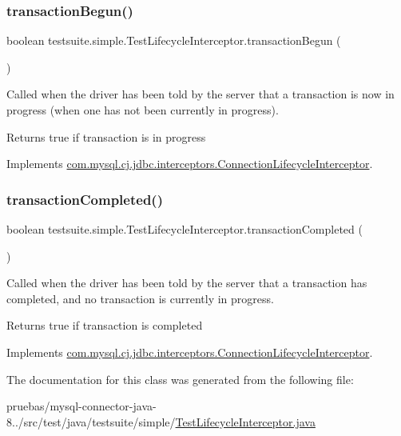 \subsubsection{\texorpdfstring{transaction\+Begun()}{transactionBegun()}}
{\footnotesize\ttfamily boolean testsuite.\+simple.\+Test\+Lifecycle\+Interceptor.\+transaction\+Begun (\begin{DoxyParamCaption}{ }\end{DoxyParamCaption})}

Called when the driver has been told by the server that a transaction is now in progress (when one has not been currently in progress).

\begin{DoxyReturn}{Returns}
true if transaction is in progress 
\end{DoxyReturn}


Implements \mbox{\hyperlink{interfacecom_1_1mysql_1_1cj_1_1jdbc_1_1interceptors_1_1_connection_lifecycle_interceptor_a8786e9ce2e821f0f59bffc9343ffbb7c}{com.\+mysql.\+cj.\+jdbc.\+interceptors.\+Connection\+Lifecycle\+Interceptor}}.

\mbox{\label{classtestsuite_1_1simple_1_1_test_lifecycle_interceptor_a00973c1a52ebc81176be2b9a46f5aa66}} 
\subsubsection{\texorpdfstring{transaction\+Completed()}{transactionCompleted()}}
{\footnotesize\ttfamily boolean testsuite.\+simple.\+Test\+Lifecycle\+Interceptor.\+transaction\+Completed (\begin{DoxyParamCaption}{ }\end{DoxyParamCaption})}

Called when the driver has been told by the server that a transaction has completed, and no transaction is currently in progress.

\begin{DoxyReturn}{Returns}
true if transaction is completed 
\end{DoxyReturn}


Implements \mbox{\hyperlink{interfacecom_1_1mysql_1_1cj_1_1jdbc_1_1interceptors_1_1_connection_lifecycle_interceptor_a53811dd190160d999a9e217cf9208a84}{com.\+mysql.\+cj.\+jdbc.\+interceptors.\+Connection\+Lifecycle\+Interceptor}}.



The documentation for this class was generated from the following file\+:\begin{DoxyCompactItemize}
\item 
pruebas/mysql-\/connector-\/java-\/8../src/test/java/testsuite/simple/\mbox{\hyperlink{_test_lifecycle_interceptor_8java}{Test\+Lifecycle\+Interceptor.\+java}}\end{DoxyCompactItemize}
